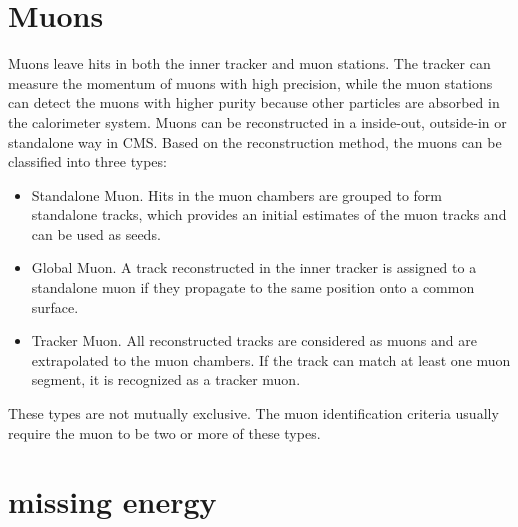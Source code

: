 \documentclass[thesis.tex]{subfiles}
\begin{document}
\section{Muons}
Muons leave hits in both the inner tracker and muon stations.
The tracker can measure the momentum of muons with high precision, while the muon stations can detect the muons with higher purity because other particles are absorbed in the calorimeter system. 
Muons can be reconstructed in a inside-out, outside-in or standalone way in CMS.
Based on the reconstruction method, the muons can be classified into three types: 
\begin{itemize}
	\item Standalone Muon. Hits in the muon chambers are grouped to form standalone tracks, which provides an initial estimates of the muon tracks and can be used as seeds.
	\item Global Muon. A track reconstructed in the inner tracker is assigned to a standalone muon if they propagate to the same position onto a common surface. 
	\item Tracker Muon. All reconstructed tracks are considered as muons and are extrapolated to the muon chambers. If the track can match at least one muon segment, it is recognized as a tracker muon. 
\end{itemize}
These types are not mutually exclusive.
The muon identification criteria usually require the muon to be two or more of these types. 

\section{missing energy}
\end{document}
